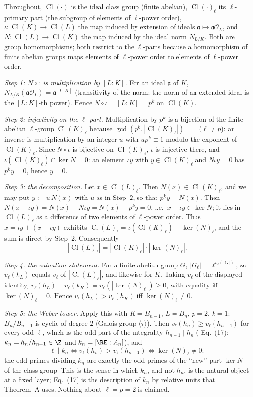 Throughout, $\operatorname{Cl}(\cdot)$ is the ideal class group (finite abelian), $\operatorname{Cl}(\cdot)_\ell$ its $\ell$-primary part (the subgroup of elements of $\ell$-power order), $\iota:\operatorname{Cl}(K)\to\operatorname{Cl}(L)$ the map induced by extension of ideals $\mathfrak a\mapsto\mathfrak a\mathcal O_L$, and $N:\operatorname{Cl}(L)\to\operatorname{Cl}(K)$ the map induced by the ideal norm $N_{L/K}$. Both are group homomorphisms; both restrict to the $\ell$-parts because a homomorphism of finite abelian groups maps elements of $\ell$-power order to elements of $\ell$-power order.

\emph{Step 1: $N\circ\iota$ is multiplication by $[L:K]$.} For an ideal $\mathfrak a$ of $K$, $N_{L/K}(\mathfrak a\mathcal O_L)=\mathfrak a^{[L:K]}$ (transitivity of the norm: the norm of an extended ideal is the $[L:K]$-th power). Hence $N\circ\iota=[L:K]=p^k$ on $\operatorname{Cl}(K)$.

\emph{Step 2: injectivity on the $\ell$-part.} Multiplication by $p^k$ is a bijection of the finite abelian $\ell$-group $\operatorname{Cl}(K)_\ell$ because $\gcd(p^k,|\operatorname{Cl}(K)_\ell|)=1$ ($\ell\ne p$); an inverse is multiplication by an integer $u$ with $up^k\equiv1$ modulo the exponent of $\operatorname{Cl}(K)_\ell$. Since $N\circ\iota$ is bijective on $\operatorname{Cl}(K)_\ell$, $\iota$ is injective there, and $\iota(\operatorname{Cl}(K)_\ell)\cap\ker N=0$: an element $\iota y$ with $y\in\operatorname{Cl}(K)_\ell$ and $N\iota y=0$ has $p^ky=0$, hence $y=0$.

\emph{Step 3: the decomposition.} Let $x\in\operatorname{Cl}(L)_\ell$. Then $N(x)\in\operatorname{Cl}(K)_\ell$, and we may put $y:=u\,N(x)$ with $u$ as in Step~2, so that $p^ky=N(x)$. Then $N(x-\iota y)=N(x)-N\iota y=N(x)-p^ky=0$, i.e.\ $x-\iota y\in\ker N$; it lies in $\operatorname{Cl}(L)_\ell$ as a difference of two elements of $\ell$-power order. Thus $x=\iota y+(x-\iota y)$ exhibits $\operatorname{Cl}(L)_\ell=\iota(\operatorname{Cl}(K)_\ell)+\ker(N)_\ell$, and the sum is direct by Step~2. Consequently
\[ |\operatorname{Cl}(L)_\ell|=|\operatorname{Cl}(K)_\ell|\cdot|\ker(N)_\ell| . \]

\emph{Step 4: the valuation statement.} For a finite abelian group $G$, $|G_\ell|=\ell^{v_\ell(|G|)}$, so $v_\ell(h_L)$ equals $v_\ell$ of $|\operatorname{Cl}(L)_\ell|$, and likewise for $K$. Taking $v_\ell$ of the displayed identity, $v_\ell(h_L)-v_\ell(h_K)=v_\ell(|\ker(N)_\ell|)\ge0$, with equality iff $\ker(N)_\ell=0$. Hence $v_\ell(h_L)>v_\ell(h_K)$ iff $\ker(N)_\ell\ne0$.

\emph{Step 5: the Weber tower.} Apply this with $K=B_{n-1}$, $L=B_n$, $p=2$, $k=1$: $B_n/B_{n-1}$ is cyclic of degree $2$ (Galois group $\langle\tau\rangle$). Then $v_\ell(h_n)\ge v_\ell(h_{n-1})$ for every odd $\ell$, which is the odd part of the integrality $h_{n-1}\mid h_n$ (\cite{KY} Eq.~(17): $k_n=h_n/h_{n-1}\in\Z$ and $k_n=[\RE:A_n]$), and
\[ \ell\mid k_n\iff v_\ell(h_n)>v_\ell(h_{n-1})\iff\ker(N)_\ell\ne0 : \]
the odd primes dividing $k_n$ are exactly the odd primes of the ``new'' part $\ker N$ of the class group. This is the sense in which $k_n$, and not $h_n$, is the natural object at a fixed layer; \cite{KY} Eq.~(17) is the description of $k_n$ by relative units that Theorem~A uses. Nothing about $\ell=p=2$ is claimed.
